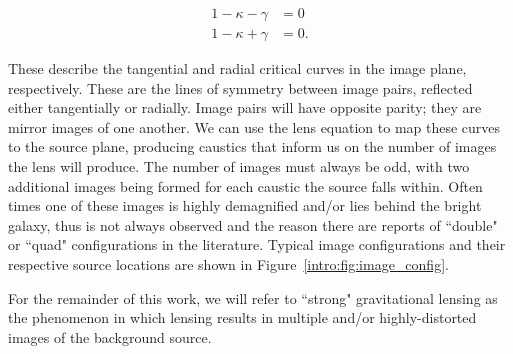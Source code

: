 \begin{align}
1-\kappa-\gamma &= 0 \\
1-\kappa+\gamma &= 0.
\end{align}

\noindent These describe the tangential and radial critical curves in the image plane, respectively. These are the lines of symmetry between image pairs, reflected either tangentially or radially. Image pairs will have opposite parity; they are mirror images of one another. We can use the lens equation to map these curves to the source plane, producing caustics that inform us on the number of images the lens will produce. The number of images must always be odd, with two additional images being formed for each caustic the source falls within. Often times one of these images is highly demagnified and/or lies behind the bright galaxy, thus is not always observed and the reason there are reports of ``double" or ``quad" configurations in the literature. Typical image configurations and their respective source locations are shown in Figure~\ref{intro:fig:image_config}.

For the remainder of this work, we will refer to ``strong" gravitational lensing as the phenomenon in which lensing results in multiple and/or highly-distorted images of the background source.


